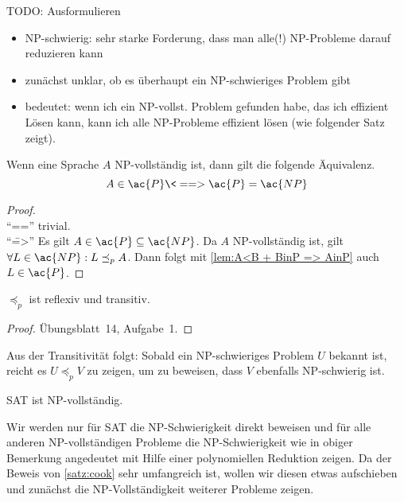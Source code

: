 {\color{red}
TODO: Ausformulieren
\begin{itemize}
 \item \ac{NP}-schwierig: sehr starke Forderung, dass man alle(!) \ac{NP}-Probleme darauf reduzieren kann
 \item zunächst unklar, ob es überhaupt ein \ac{NP}-schwieriges Problem gibt
 \item bedeutet: wenn ich ein \ac{NP}-vollst. Problem gefunden habe, das ich effizient Lösen kann, kann ich alle \ac{NP}-Probleme effizient lösen (wie folgender Satz zeigt).
\end{itemize}
}
\begin{Satz}
	Wenn eine Sprache $A$ \ac{NP}-vollständig ist, dann gilt die folgende Äquivalenz.
	\[ A\in \ac{P} \<==> \ac{P} =\ac{NP} \qedhere \]
\end{Satz}
\begin{proof}\ \\
	"`\<=="' trivial.\\
	"`\==>"' Es gilt $A\in \ac{P} \subseteq \ac{NP}$. Da $A$ \ac{NP}-vollständig ist, gilt $\forall L\in \ac{NP}: L\preceq_p A$. Dann folgt mit \autoref{lem:A<B + BinP => AinP} auch $L\in \ac{P}$.
\end{proof}

\begin{lemma}[name={[$\preceq_p$ ist reflexiv und transitiv]}]
	$\preceq_p$ ist reflexiv und transitiv.
\end{lemma}
\begin{proof}
Übungsblatt~14, Aufgabe~1.
\end{proof}

\begin{Bem}
    Aus der Transitivität folgt:
	Sobald ein \ac{NP}-schwieriges Problem $U$ bekannt ist, reicht es $U\preceq_p V$ zu zeigen, um zu beweisen, dass $V$ ebenfalls \ac{NP}-schwierig ist.
\end{Bem}

\begin{Satz}[Cook]\label{satz:cook}
	\ac{SAT} ist \ac{NP}-vollständig.
\end{Satz}
Wir werden nur für \ac{SAT} die \ac{NP}-Schwierigkeit direkt beweisen und für alle anderen \ac{NP}-vollständigen Probleme die \ac{NP}-Schwierigkeit wie in obiger Bemerkung angedeutet mit Hilfe einer polynomiellen Reduktion zeigen.
Da der Beweis von \autoref{satz:cook} sehr umfangreich ist, wollen wir diesen etwas aufschieben und zunächst die \ac{NP}-Vollständigkeit weiterer Probleme zeigen.


